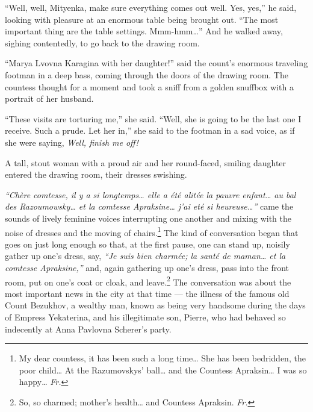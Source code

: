 ``Well, well, Mityenka, make sure everything comes out well. Yes, yes,'' he said, looking with pleasure at an enormous table being brought out. ``The most important thing are the table settings. Mmm-hmm\ldots{}'' And he walked away, sighing contentedly, to go back to the drawing room. %

``Marya Lvovna Karagina with her daughter!'' said the count's enormous traveling footman in a deep bass, coming through the doors of the drawing room. The countess thought for a moment and took a sniff from a golden snuffbox with a portrait of her husband.

``These visits are torturing me,'' she said. ``Well, she is going to be the last one I receive. Such a prude. Let her in,'' she said to the footman in a sad voice, as if she were saying, \textit{Well, finish me off!} %

A tall, stout woman with a proud air and her round-faced, smiling daughter entered the drawing room, their dresses swishing.

\textit{``Ch\`ere comtesse, il y a si longtemps\ldots{} elle a \'et\'e alit\'ee la pauvre enfant\ldots{} au bal des Razoumowsky\ldots{} et la comtesse Apraksine\ldots{} j'ai et\'e si heureuse\ldots{}''} came the sounds of lively feminine voices interrupting one another and mixing with the noise of dresses and the moving of chairs.\footnote{My dear countess, it has been such a long time\ldots{} She has been bedridden, the poor child\ldots{} At the Razumovskys' ball\ldots{} and the Countess Apraksin\ldots{} I was so happy\ldots{} \textit{Fr.}} The kind of conversation began that goes on just long enough so that, at the first pause, one can stand up, noisily gather up one's dress, say, \textit{``Je suis bien charm\'ee; la sant\'e de maman\ldots{} et la comtesse Apraksine,''} and, again gathering up one's dress, pass into the front room, put on one's coat or cloak, and leave.\footnote{So, so charmed; mother's health\ldots{} and Countess Apraksin. \textit{Fr.}} The conversation was about the most important news in the city at that time --- the illness of the famous old Count Bezukhov, a wealthy man, known as being very handsome during the days of Empress Yekaterina, and his illegitimate son, Pierre, who had behaved so indecently at Anna Pavlovna Scherer's party.
